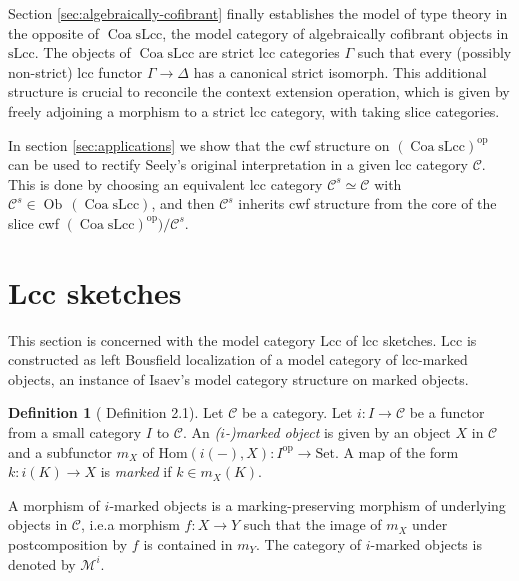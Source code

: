 \documentclass[a4paper]{article}
\theoremstyle{remark}
\theoremstyle{definition}
\newtheorem{definition}[theorem]{Definition}
\begin{document}
Section \ref{sec:algebraically-cofibrant} finally establishes the model of type theory in the opposite of $\operatorname{Coa} \mathrm{sLcc}$, the model category of algebraically cofibrant objects in $\mathrm{sLcc}$.
The objects of $\operatorname{Coa} \mathrm{sLcc}$ are strict lcc categories $\Gamma$ such that every (possibly non-strict) lcc functor $\Gamma \rightarrow \Delta$ has a canonical strict isomorph.
This additional structure is crucial to reconcile the context extension operation, which is given by freely adjoining a morphism to a strict lcc category, with taking slice categories.

In section \ref{sec:applications} we show that the cwf structure on $(\operatorname{Coa} \mathrm{sLcc})^\mathrm{op}$ can be used to rectify Seely's original interpretation in a given lcc category $\mathcal{C}$.
This is done by choosing an equivalent lcc category $\mathcal{C}^s \simeq \mathcal{C}$ with $\mathcal{C}^s \in \operatorname{Ob} \, (\operatorname{Coa} \mathrm{sLcc})$, and then $\mathcal{C}^s$ inherits cwf structure from the core of the slice cwf $(\operatorname{Coa} \mathrm{sLcc})^\mathrm{op}) / \mathcal{C}^s$.

\section{Lcc sketches}
\label{sec:lcc-sketches}

This section is concerned with the model category $\mathrm{Lcc}$ of lcc sketches.
$\mathrm{Lcc}$ is constructed as left Bousfield localization of a model category of lcc-marked objects, an instance of Isaev's model category structure on marked objects.

\begin{definition}[\cite{marked-objects} Definition 2.1]
  Let $\mathcal{C}$ be a category.
  Let $i : I \rightarrow \mathcal{C}$ be a functor from a small category $I$ to $\mathcal{C}$.
  An \emph{($i$-)marked object} is given by an object $X$ in $\mathcal{C}$ and a subfunctor $m_X$ of $\mathrm{Hom}(i(-), X) : I^\mathrm{op} \rightarrow \mathrm{Set}$.
  A map of the form $k : i(K) \rightarrow X$ is \emph{marked} if $k \in m_X(K)$.

  A morphism of $i$-marked objects is a marking-preserving morphism of underlying objects in $\mathcal{C}$, i.e.\@ a morphism $f : X \rightarrow Y$ such that the image of $m_X$ under postcomposition by $f$ is contained in $m_Y$.
  The category of $i$-marked objects is denoted by $\mathcal{M}^i$.
\end{definition}
\end{document}
